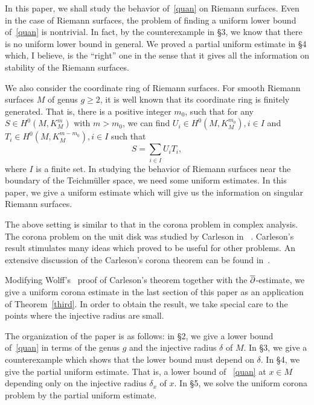 In this paper, we shall study the behavior of~\eqref{quan} on
Riemann surfaces. Even in the case of Riemann surfaces, the problem
of finding a uniform lower bound of~\eqref{quan} is nontrivial.
In fact, by
the counterexample in \S 3, we know that there is no uniform lower
bound in general.  We proved a partial uniform estimate in \S 4
which, I believe, is the ``right'' one in the sense that it gives all the
information on  stability of the Riemann surfaces. 


We also consider the coordinate ring of Riemann surfaces. For smooth
Riemann surfaces $M$ of genus $g\geq 2$, it is well  known that its
coordinate ring is
finitely
generated. That is, there is a positive integer $m_0$, such that
for any $S\in H^0(M, K_M^m)$ with $m>m_0$, we can find $U_i\in H^0(M,
K_M^{m_0}), i\in
I$ and $T_i\in H^0(M, K_M^{m-m_0}), i\in 
I$
such that
\[
S=\sum_{i\in I} U_iT_i,
\]
where $I$ is a finite set. In studying the behavior of 
Riemann surfaces near the boundary of the Teichm\"uller space, we need
some uniform estimates. In this paper, we give a uniform estimate
which will give us the information on  singular Riemann surfaces.  

The above setting is similar to that in the corona problem
in complex analysis.
The corona problem on the unit disk was studied by Carleson
in ~\cite
{MR25:5186}. Carleson's result
stimulates many ideas which proved to be useful for other problems.
An extensive discussion of the Carleson's corona theorem can be found
in~\cite{JBG}. 

Modifying Wolff's~\cite{WT} proof of Carleson's
theorem together with the $\overline{\partial}$-estimate, we give
a uniform corona estimate in the last section of this paper
as an application of Theorem~\ref{third}.
In order to obtain the result, we  take
 special care
to the points where the injective radius are small. 















The organization of the paper is as follows: in \S 2, we give a lower
bound of~\eqref{quan} in terms of the genus $g$ and the injective radius
$\delta$ of $M$. In \S 3, we give a counterexample which shows that the
lower bound must depend on $\delta$. In \S 4, we give the partial uniform
estimate. That is, a lower bound of ~\eqref{quan} at $x\in M$ depending
only on the injective radius $\delta_x$ of $x$. In \S 5, we solve the
uniform corona problem by the partial uniform estimate.






